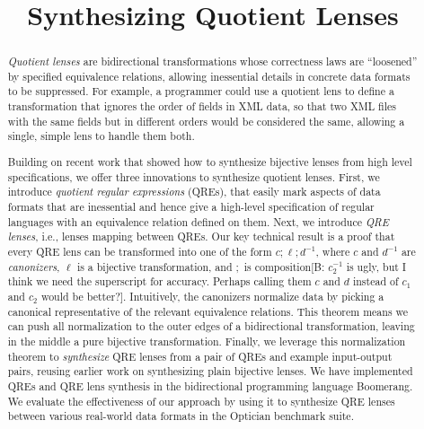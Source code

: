 \documentclass[acmsmall,review,anonymous]{acmart}
\newcommand{\FINISH}[3]{\ifdraft\textcolor{#1}{[#2: #3]}\fi}
\newcommand{\bcp}[1]{\FINISH{dkred}{B}{#1}}
\begin{document}
\title{Synthesizing Quotient Lenses}
\begin{abstract}
{\em Quotient lenses} are bidirectional transformations whose correctness
laws are ``loosened'' by specified equivalence relations, allowing
inessential details in concrete data formats to be suppressed. 
For example, a programmer could use a quotient lens to define 
a transformation that ignores the order of fields in XML data, so
that two XML files with the same fields but in different orders would be
considered the same, allowing a single, simple lens to handle them both. 

Building on recent work that showed how to synthesize bijective lenses from high
level specifications, we offer three innovations to synthesize quotient lenses.
First, we introduce {\em quotient regular expressions} (QREs), that easily mark
aspects of data formats that are inessential and hence give a high-level
specification of regular languages with an equivalence relation defined on
them. Next, we introduce {\em QRE lenses}, i.e., lenses mapping between QREs.
Our key technical result is a proof that every QRE lens can be transformed into
one of the form $c ; \ell ; d^{-1}$, where $c$ and $d^{-1}$ are {\em
canonizers}, $\ell$ is a bijective transformation, and $;$ is
composition\iflastminute\bcp{$c_2^{-1}$ is ugly, but I think we need the
superscript for accuracy.  Perhaps calling them $c$ and $d$ instead of $c_1$
and $c_2$ would be better?}\fi.  Intuitively, the canonizers normalize data by
picking a canonical representative of the relevant equivalence relations. This
theorem means we can push all normalization to the outer edges of a
bidirectional transformation, leaving in the middle a pure bijective
transformation. Finally, we leverage this normalization theorem to {\em
synthesize} QRE lenses from a pair of QREs and example input-output pairs,
reusing earlier work on synthesizing plain bijective lenses. We have
implemented QREs and QRE lens synthesis in the bidirectional programming
language Boomerang. We evaluate the effectiveness of our approach by using it
to synthesize QRE lenses between various real-world data formats in the
Optician benchmark suite.

\end{abstract}

\maketitle
\end{document}
